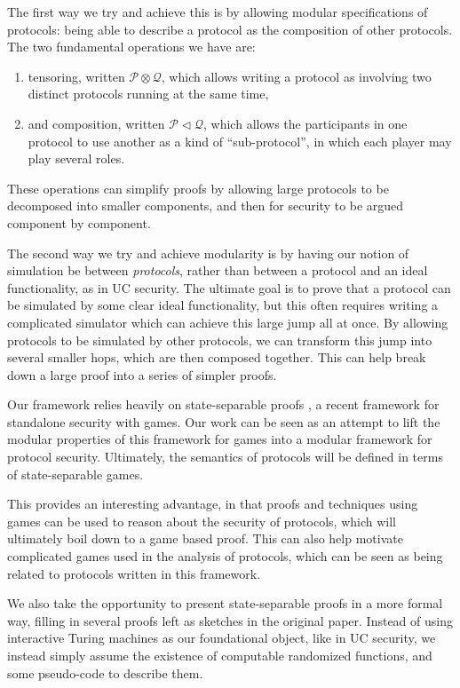 The first way we try and achieve this is by allowing
modular specifications of protocols: being able to describe a protocol
as the composition of other protocols.
The two fundamental operations we have are:
\begin{enumerate}
\item tensoring, written $\mathscr{P} \otimes \mathscr{Q}$,
which allows writing a protocol as involving two distinct protocols
running at the same time,
\item and composition, written $\mathscr{P} \lhd \mathscr{Q}$,
which allows the participants in one protocol to use another
as a kind of ``sub-protocol'', in which each player may play
several roles.
\end{enumerate}
These operations can simplify proofs by allowing large protocols
to be decomposed into smaller components,
and then for security to be argued component by component.

The second way we try and achieve modularity is by having our
notion of simulation be between \emph{protocols},
rather than between a protocol and an ideal functionality,
as in UC security.
The ultimate goal is to prove that a protocol can be simulated
by some clear ideal functionality,
but this often requires writing a complicated simulator
which can achieve this large jump all at once.
By allowing protocols to be simulated by other protocols,
we can transform this jump into several smaller hops,
which are then composed together.
This can help break down a large proof into a series of simpler proofs.

Our framework relies heavily on state-separable proofs \cite{AC:BDFKK18},
a recent framework for standalone security with games.
Our work can be seen as an attempt to lift the modular
properties of this framework for games into a modular
framework for protocol security.
Ultimately, the semantics of protocols will be defined in terms
of state-separable games.

This provides an interesting advantage, in that proofs
and techniques using games can be used to reason
about the security of protocols, which will ultimately
boil down to a game based proof.
This can also help motivate complicated games used in the analysis
of protocols, which can be seen as being related to protocols
written in this framework.

We also take the opportunity to present state-separable proofs
in a more formal way, filling in several proofs left as sketches
in the original paper.
Instead of using interactive Turing machines as our foundational
object, like in UC security,
we instead simply assume the existence of computable randomized functions,
and some pseudo-code to describe them.

